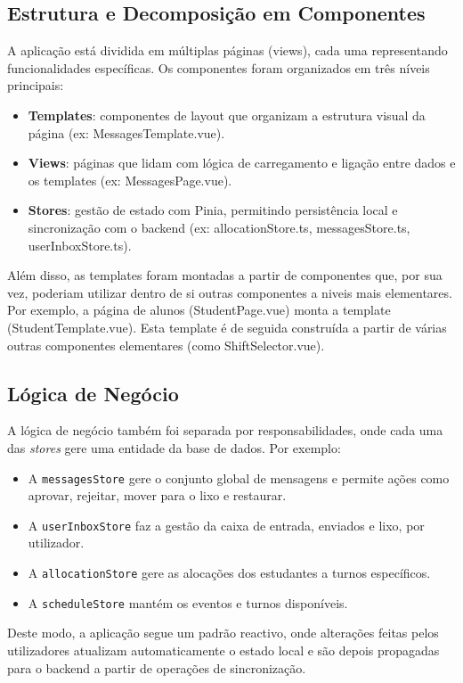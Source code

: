 \documentclass{article}
\begin{document}
\subsection{Estrutura e Decomposição em Componentes}
A aplicação está dividida em múltiplas páginas (views), cada uma representando funcionalidades específicas. Os componentes foram organizados em três níveis principais:

\begin{itemize}
    \item \textbf{Templates}: componentes de layout que organizam a estrutura visual da página (ex: MessagesTemplate.vue).
    \item \textbf{Views}: páginas que lidam com lógica de carregamento e ligação entre dados e os templates (ex: MessagesPage.vue).
    \item \textbf{Stores}: gestão de estado com Pinia, permitindo persistência local e sincronização com o backend (ex: allocationStore.ts, messagesStore.ts, userInboxStore.ts).
\end{itemize}
Além disso, as templates foram montadas a partir de componentes que, por sua vez, poderiam utilizar dentro de si outras componentes a niveis mais elementares. Por exemplo, a página de alunos (StudentPage.vue) monta a template (StudentTemplate.vue). Esta template é de seguida construída a partir de várias outras componentes elementares (como ShiftSelector.vue).

\subsection{Lógica de Negócio}
A lógica de negócio também foi separada por responsabilidades, onde cada uma das \textit{stores} gere uma entidade da base de dados. Por exemplo:

\begin{itemize}
    \item A \texttt{messagesStore} gere o conjunto global de mensagens e permite ações como aprovar, rejeitar, mover para o lixo e restaurar.
    \item A \texttt{userInboxStore} faz a gestão da caixa de entrada, enviados e lixo, por utilizador.
    \item A \texttt{allocationStore} gere as alocações dos estudantes a turnos específicos.
    \item A \texttt{scheduleStore} mantém os eventos e turnos disponíveis.
\end{itemize}
Deste modo, a aplicação segue um padrão reactivo, onde alterações feitas pelos utilizadores atualizam automaticamente o estado local e são depois propagadas para o backend a partir de operações de sincronização.
\end{document}
